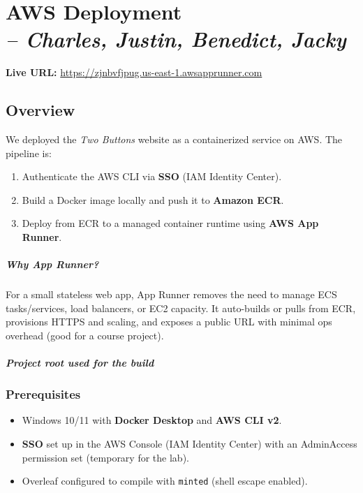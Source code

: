 \chapter[AWS Deployment]{AWS Deployment\\\small{\textit{-- Charles, Justin, Benedict, Jacky}}}
\label{Chapter::AWS Deployment}

\noindent\textbf{Live URL:} \url{https://zjnbvfjpug.us-east-1.awsapprunner.com}

\section*{Overview}
We deployed the \emph{Two Buttons} website as a containerized service on AWS. The pipeline is:
\begin{enumerate}
  \item Authenticate the AWS CLI via \textbf{SSO} (IAM Identity Center).
  \item Build a Docker image locally and push it to \textbf{Amazon ECR}.
  \item Deploy from ECR to a managed container runtime using \textbf{AWS App Runner}.
\end{enumerate}

\paragraph{Why App Runner?}
For a small stateless web app, App Runner removes the need to manage ECS tasks/services, load balancers, or EC2 capacity. It auto-builds or pulls from ECR, provisions HTTPS and scaling, and exposes a public URL with minimal ops overhead (good for a course project).

\paragraph{Project root used for the build}

\subsection*{Prerequisites}
\begin{itemize}
  \item Windows 10/11 with \textbf{Docker Desktop} and \textbf{AWS CLI v2}.
  \item \textbf{SSO} set up in the AWS Console (IAM Identity Center) with an AdminAccess permission set (temporary for the lab).
  \item Overleaf configured to compile with \texttt{minted} (shell escape enabled).
\end{itemize}

